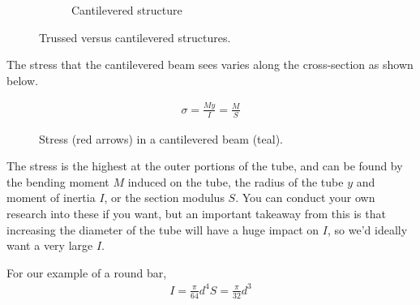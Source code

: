 \documentclass[10pt,letterpaper]{book}
\begin{document}
\begin{figure}[H]
\begin{subfigure}[b]{.35\linewidth}
\caption{Cantilevered structure}
\end{subfigure}
\caption{Trussed versus cantilevered structures.}
\end{figure}

The stress that the cantilevered beam sees varies along the cross-section as shown below.

\begin{figure}[H]
\begin{subfigure}[b]{.4\linewidth}
\end{subfigure}\begin{subfigure}[b]{.5\linewidth}
\large
\begin{align}
	\sigma = \frac{M y}{I} = \frac{M}{S}
\end{align}
\end{subfigure}
\caption{Stress (red arrows) in a cantilevered beam (teal).}
\end{figure}

The stress is the highest at the outer portions of the tube, and can be found by the bending moment $M$ induced on the tube, the radius of the tube $y$ and moment of inertia $I$, or the section modulus $S$. You can conduct your own research into these if you want, but an important takeaway from this is that increasing the diameter of the tube will have a huge impact on $I$, so we'd ideally want a very large $I$.

For our example of a round bar,
\begin{align}
	I = \frac{\pi}{64}d^4
	S = \frac{\pi}{32}d^3
\end{align}
\end{document}
